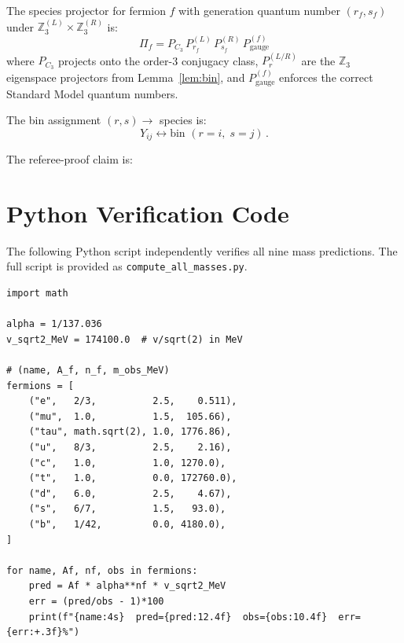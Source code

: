 \documentclass[11pt,a4paper]{article}
\begin{document}
The species projector for fermion $f$ with generation quantum number
$(r_f, s_f)$ under $\mathbb{Z}_3^{(L)}\times\mathbb{Z}_3^{(R)}$ is:
\begin{equation}
\Pi_f = P_{C_3}\,P_{r_f}^{(L)}\,P_{s_f}^{(R)}\,P_{\text{gauge}}^{(f)}
\end{equation}
where $P_{C_3}$ projects onto the order-3 conjugacy class,
$P_r^{(L/R)}$ are the $\mathbb{Z}_3$ eigenspace projectors from
Lemma~\ref{lem:bin}, and $P_{\text{gauge}}^{(f)}$ enforces the correct
Standard Model quantum numbers.

The bin assignment $(r,s)\to$ species is:
\[
Y_{ij} \longleftrightarrow \text{bin } (r=i,\;s=j)\,.
\]

The referee-proof claim is:

\medskip
\noindent{}


\section{Python Verification Code}
\label{sec:code}

The following Python script independently verifies all nine mass predictions.
The full script is provided as \texttt{compute\_all\_masses.py}.

\begin{lstlisting}[caption={Core mass computation.}]
import math

alpha = 1/137.036
v_sqrt2_MeV = 174100.0  # v/sqrt(2) in MeV

# (name, A_f, n_f, m_obs_MeV)
fermions = [
    ("e",   2/3,          2.5,    0.511),
    ("mu",  1.0,          1.5,  105.66),
    ("tau", math.sqrt(2), 1.0, 1776.86),
    ("u",   8/3,          2.5,    2.16),
    ("c",   1.0,          1.0, 1270.0),
    ("t",   1.0,          0.0, 172760.0),
    ("d",   6.0,          2.5,    4.67),
    ("s",   6/7,          1.5,   93.0),
    ("b",   1/42,         0.0, 4180.0),
]

for name, Af, nf, obs in fermions:
    pred = Af * alpha**nf * v_sqrt2_MeV
    err = (pred/obs - 1)*100
    print(f"{name:4s}  pred={pred:12.4f}  obs={obs:10.4f}  err={err:+.3f}%")
\end{lstlisting}
\end{document}
